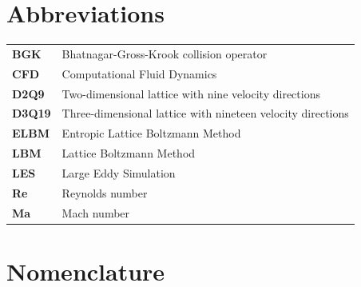 \documentclass[12pt, a4paper, twoside, openright]{report}
\theoremstyle{definition}
\theoremstyle{remark}
\newcommand\myemptypage{
    \null
    \thispagestyle{empty}
    \addtocounter{page}{-1}
    \newpage
}
\begin{document}
\myemptypage

\tableofcontents

\listoffigures

\listoftables

\chapter*{Abbreviations}

\begin{tabular}{ll}
\textbf{BGK} & Bhatnagar-Gross-Krook collision operator\\
\textbf{CFD} & Computational Fluid Dynamics\\
\textbf{D2Q9} & Two-dimensional lattice with nine velocity directions\\
\textbf{D3Q19} & Three-dimensional lattice with nineteen velocity directions\\
\textbf{ELBM} & Entropic Lattice Boltzmann Method\\
\textbf{LBM} & Lattice Boltzmann Method\\
\textbf{LES} & Large Eddy Simulation\\
\textbf{Re} & Reynolds number\\
\textbf{Ma} & Mach number\\
\end{tabular}

\chapter*{Nomenclature}
\end{document}
